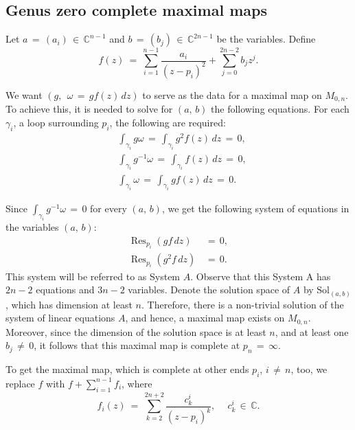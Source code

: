 \documentclass[12pt]{amsart}
\numberwithin{equation}{section}
\begin{document}
\subsection{Genus zero complete maximal maps}\label{subsec: genus zero}

Let \( a \,=\, (a_i) \,\in\, \mathbb{C}^{n-1} \) and \( b \,=\, (b_j) \,\in\, \mathbb{C}^{2n-1} \) be the
variables. Define
\begin{equation}\label{eq 4.1:initial f}
 f(z)\ =\ \sum_{i=1}^{n-1} \frac{a_i}{(z - p_i)^2} + \sum_{j=0}^{2n-2} b_j z^j.
\end{equation}

We want \(\left(g,\, \; \omega \,=\, g f(z) \, dz \right)\) to serve as the data for a maximal map on
\(M_{0,n}\). To achieve this, it is needed to solve for \((a,\, b)\) the following equations. For each
\(\gamma_i\), a loop surrounding \(p_i\), the following are required:
\begin{align*}
&\int_{\gamma_i} g \omega \,=\, \int_{\gamma_i} g^2 f(z) \, dz \,=\, 0,\\  
&\int_{\gamma_i} g^{-1} \omega \,=\, \int_{\gamma_i} f(z) \, dz \,=\, 0,\\ 
&\int_{\gamma_i} \omega \,=\, \int_{\gamma_i} g f(z) \, dz \,=\, 0.
\end{align*}

Since \(\int_{\gamma_i} g^{-1} \omega \,=\, 0\) for every \((a,\, b)\), we get  the following system of equations
in the variables \((a,\, b)\):
\begin{align}
  \label{eq1:0 genus period problem}  
  \operatorname{Res}_{p_i}(g f \, dz) &\,=\, 0,\\
  \label{eqn1:0 genus Period Problem secton}  
  \operatorname{Res}_{p_i}(g^2 f \, dz) &\,=\, 0.
\end{align}
This system will be referred to as System \(A\). Observe that this System A has \(2n - 2\) equations and \(3n - 
2\) variables. Denote the solution space of \(A\) by \(\text{Sol}_{(a,b)}\), which has dimension at least 
\(n\). Therefore, there is a non-trivial solution of the system of linear equations \(A\), and hence, a maximal 
map exists on \(M_{0,n}\). Moreover, since the dimension of the solution space is at least \(n\), and at least one 
\(b_j \,\neq\, 0\), it follows that this maximal map is complete at \(p_n\,=\,\infty\).

To get the maximal map, which is complete at other ends \(p_i\), $i\,\neq\, n$, too,  we replace \(f\) with \(f + \sum_{i=1}^{n-1} 
f_i\), where
\begin{equation}\label{equation:completeness argument}
f_i(z)\ =\ \sum_{k=2}^{2n+2} \frac{c_k^i}{(z - p_i)^k},\ \quad{c_k^i \,\in\, \mathbb{C}}.
\end{equation}
\end{document}
